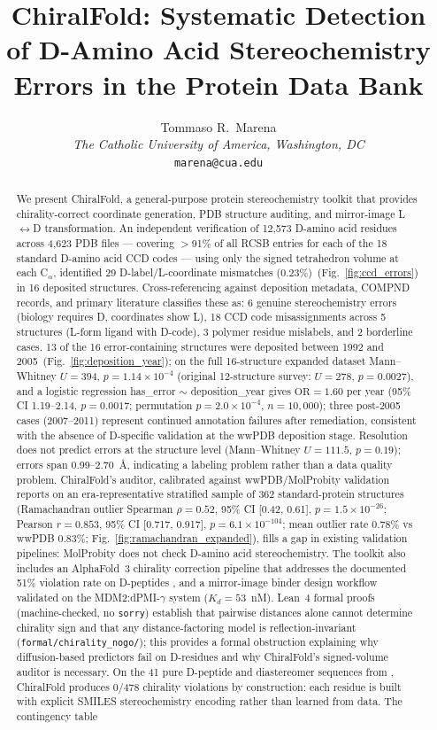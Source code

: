 \documentclass[11pt]{article}
\title{ChiralFold: Systematic Detection of D-Amino Acid Stereochemistry Errors in the Protein Data Bank}
\author{Tommaso R.\ Marena\\
\textit{The Catholic University of America, Washington, DC}\\
\texttt{marena@cua.edu}}
\date{}
\begin{document}
\maketitle

\begin{abstract}
We present ChiralFold, a general-purpose protein stereochemistry toolkit that provides chirality-correct coordinate generation, PDB structure auditing, and mirror-image L$\leftrightarrow$D transformation. An independent verification of 12,573 D-amino acid residues across 4,623 PDB files --- covering $>$91\% of all RCSB entries for each of the 18 standard D-amino acid CCD codes --- using only the signed tetrahedron volume at each C$_\alpha$, identified 29 D-label/L-coordinate mismatches (0.23\%)~(Fig.~\ref{fig:ccd_errors}) in 16 deposited structures. Cross-referencing against deposition metadata, COMPND records, and primary literature classifies these as: 6 genuine stereochemistry errors (biology requires D, coordinates show L), 18 CCD code misassignments across 5 structures (L-form ligand with D-code), 3 polymer residue mislabels, and 2 borderline cases. 13 of the 16 error-containing structures were deposited between 1992 and 2005~(Fig.~\ref{fig:deposition_year}); on the full 16-structure expanded dataset Mann--Whitney $U=394$, $p=1.14\times10^{-4}$ (original 12-structure survey: $U=278$, $p=0.0027$), and a logistic regression has\_error $\sim$ deposition\_year gives $\mathrm{OR}=1.60$ per year (95\% CI 1.19--2.14, $p=0.0017$; permutation $p=2.0\times10^{-4}$, $n=10{,}000$); three post-2005 cases (2007--2011) represent continued annotation failures after remediation, consistent with the absence of D-specific validation at the wwPDB deposition stage. Resolution does not predict errors at the structure level (Mann--Whitney $U=111.5$, $p=0.19$); errors span 0.99--2.70~\AA, indicating a labeling problem rather than a data quality problem. ChiralFold's auditor, calibrated against wwPDB/MolProbity validation reports on an era-representative stratified sample of 362 standard-protein structures (Ramachandran outlier Spearman $\rho=0.52$, 95\% CI [0.42, 0.61], $p=1.5\times10^{-26}$; Pearson $r=0.853$, 95\% CI [0.717, 0.917], $p=6.1\times10^{-104}$; mean outlier rate 0.78\% vs wwPDB 0.83\%; Fig.~\ref{fig:ramachandran_expanded}), fills a gap in existing validation pipelines: MolProbity does not check D-amino acid stereochemistry. The toolkit also includes an AlphaFold~3 chirality correction pipeline that addresses the documented 51\% violation rate on D-peptides \citep{childs2025}, and a mirror-image binder design workflow validated on the MDM2:dPMI-$\gamma$ system ($K_d=53$~nM). Lean~4 formal proofs (machine-checked, no \texttt{sorry}) establish that pairwise distances alone cannot determine chirality sign and that any distance-factoring model is reflection-invariant (\texttt{formal/chirality\_nogo/}); this provides a formal obstruction explaining why diffusion-based predictors fail on D-residues and why ChiralFold's signed-volume auditor is necessary. On the 41 pure D-peptide and diastereomer sequences from \citet{childs2025}, ChiralFold produces 0/478 chirality violations by construction: each residue is built with explicit SMILES stereochemistry encoding rather than learned from data. The contingency table 
\end{abstract}
\end{document}
